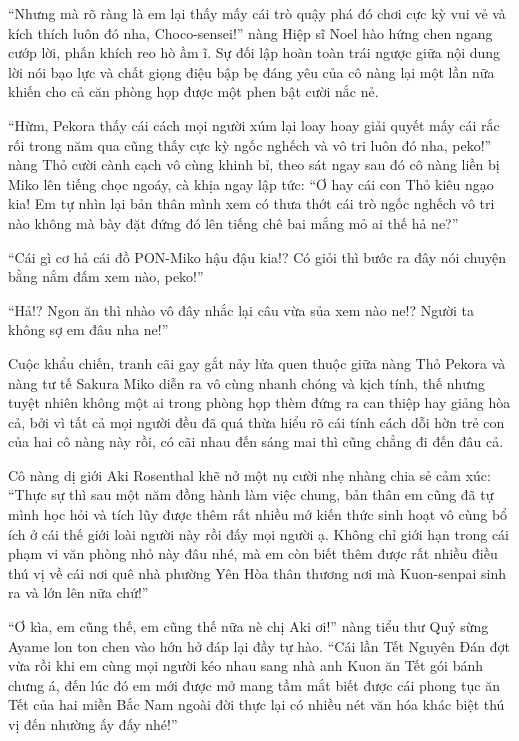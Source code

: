 \documentclass[../main.tex]{subfiles}
\begin{document}
``Nhưng mà rõ ràng là em lại thấy mấy cái trò quậy phá đó chơi cực kỳ vui vẻ và kích thích luôn đó nha, Choco-sensei!'' nàng Hiệp sĩ Noel hào hứng chen ngang cướp lời, phấn khích reo hò ầm ĩ. Sự đối lập hoàn toàn trái ngược giữa nội dung lời nói bạo lực và chất giọng điệu bập bẹ đáng yêu của cô nàng lại một lần nữa khiến cho cả căn phòng họp được một phen bật cười nắc nẻ.

``Hừm, Pekora thấy cái cách mọi người xúm lại loay hoay giải quyết mấy cái rắc rối trong năm qua cũng thấy cực kỳ ngốc nghếch và vô tri luôn đó nha, peko!'' nàng Thỏ cười cành cạch vô cùng khinh bỉ, theo sát ngay sau đó cô nàng liền bị Miko lên tiếng chọc ngoáy, cà khịa ngay lập tức: ``Ơ hay cái con Thỏ kiêu ngạo kia! Em tự nhìn lại bản thân mình xem có thưa thớt cái trò ngốc nghếch vô tri nào không mà bày đặt đứng đó lên tiếng chê bai mắng mỏ ai thế hả ne?''

``Cái gì cơ hả cái đồ PON-Miko hậu đậu kia!? Có giỏi thì bước ra đây nói chuyện bằng nắm đấm xem nào, peko!''

``Hả!? Ngon ăn thì nhào vô đây nhắc lại câu vừa sủa xem nào ne!? Người ta không sợ em đâu nha ne!''

Cuộc khẩu chiến, tranh cãi gay gắt nảy lửa quen thuộc giữa nàng Thỏ Pekora và nàng tư tế Sakura Miko diễn ra vô cùng nhanh chóng và kịch tính, thế nhưng tuyệt nhiên không một ai trong phòng họp thèm đứng ra can thiệp hay giảng hòa cả, bởi vì tất cả mọi người đều đã quá thừa hiểu rõ cái tính cách dỗi hờn trẻ con của hai cô nàng này rồi, có cãi nhau đến sáng mai thì cũng chẳng đi đến đâu cả.

Cô nàng dị giới Aki Rosenthal khẽ nở một nụ cười nhẹ nhàng chia sẻ cảm xúc: ``Thực sự thì sau một năm đồng hành làm việc chung, bản thân em cũng đã tự mình học hỏi và tích lũy được thêm rất nhiều mớ kiến thức sinh hoạt vô cùng bổ ích ở cái thế giới loài người này rồi đấy mọi người ạ. Không chỉ giới hạn trong cái phạm vi văn phòng nhỏ này đâu nhé, mà em còn biết thêm được rất nhiều điều thú vị về cái nơi quê nhà phường Yên Hòa thân thương nơi mà Kuon-senpai sinh ra và lớn lên nữa chứ!''

``Ơ kìa, em cũng thế, em cũng thế nữa nè chị Aki ơi!'' nàng tiểu thư Quỷ sừng Ayame lon ton chen vào hớn hở đáp lại đầy tự hào. ``Cái lần Tết Nguyên Đán đợt vừa rồi khi em cùng mọi người kéo nhau sang nhà anh Kuon ăn Tết gói bánh chưng á, đến lúc đó em mới được mở mang tầm mắt biết được cái phong tục ăn Tết của hai miền Bắc Nam ngoài đời thực lại có nhiều nét văn hóa khác biệt thú vị đến nhường ấy đấy nhé!''
\end{document}
